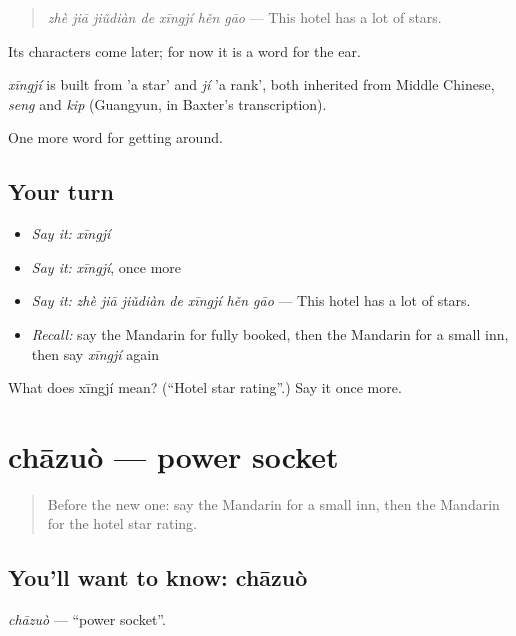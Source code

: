 \begin{quote}
\emph{zhè jiā jiǔdiàn de xīngjí hěn gāo} — This hotel has a lot of stars.
\end{quote}

Its characters come later; for now it is a word for the ear.

\begin{cousinweb}
\emph{xīngjí} is built from  'a star' and \emph{jí} 'a rank', both inherited from Middle Chinese, \emph{seng} and \emph{kip} (Guangyun, in Baxter's transcription).
\end{cousinweb}

\begin{grammarlens}[title={What you've built}]
One more word for getting around.
\end{grammarlens}

\subsection*{Your turn}
\begin{itemize}
\raggedright
  \item \emph{Say it:} \emph{xīngjí}
  \item \emph{Say it:} \emph{xīngjí}, once more
  \item \emph{Say it:} \emph{zhè jiā jiǔdiàn de xīngjí hěn gāo} — This hotel has a lot of stars.
  \item \emph{Recall:} say the Mandarin for fully booked, then the Mandarin for a small inn, then say \emph{xīngjí} again
\end{itemize}

\begin{tcolorbox}[breakable,colback=teal!4,colframe=teal!35!black,title={Before you move on}]
What does xīngjí mean? (\textquotedblleft{}Hotel star rating\textquotedblright{}.) Say it once more.
\end{tcolorbox}
\section[chāzuò]{chāzuò — power socket}

\label{lesson:ZH-C426-chazuo}



\begin{quote}
Before the new one: say the Mandarin for a small inn, then the Mandarin for the hotel star rating.
\end{quote}

\subsection*{You'll want to know: chāzuò}
\emph{chāzuò} — \textquotedblleft{}power socket\textquotedblright{}.

